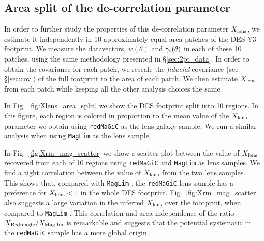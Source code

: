\documentclass[aps, prd,twocolumn,superscriptaddress,nofootinbib,preprintnumbers]{revtex4-1}
\newcommand{\gammat}{\ensuremath{\gamma_{\rm t}(\theta)}}
\newcommand{\redmagic}{\texttt{redMaGiC} }
\newcommand{\maglim}{\texttt{MagLim} }
\newcommand{\SP}[1]{{\color{orange}[SP: #1]}}
\begin{document}
\subsection{Area split of the de-correlation parameter}
In order to further study the properties of this de-correlation parameter $X_{\rm lens}$, we estimate it independently in 10 approximately equal area patches  of the DES Y3 footprint.  We measure the datavectors, $w(\theta)$ and $\gammat$ in each of these 10 patches, using the same methodology presented in \S\ref{sec:2pt_data}. In order to obtain the covariance for each patch, we rescale the \textit{fiducial} covariance (see \S\ref{sec:cov}) of the full footprint to the area of each patch. We then estimate  $X_{\rm lens}$ from each patch while keeping all the other analysis choices the same. 

In Fig.~\ref{fig:Xlens_area_split} we show the DES footprint split into 10 regions. In this figure, each region is colored in proportion to the mean value of the $X_{\rm lens}$ parameter we obtain using \redmagic as the lens galaxy sample. We run a similar analysis when using \maglim as the lens sample. 


In Fig.~\ref{fig:Xrm_mag_scatter} we show a scatter plot between the value of $X_{\rm lens}$ recovered from each of 10 regions using \redmagic and \maglim as lens samples. We find a tight correlation between the value of $X_{\rm lens}$ from the two lens samples. This shows that, compared with \maglim, the \redmagic lens sample has a preference for $X_{\rm lens} < 1$ in the whole DES footprint. Fig.~\ref{fig:Xrm_mag_scatter} also suggests a large variation  in the inferred $X_{\rm lens}$ over the footprint, when compared to \maglim. This correlation and area independence of the ratio $X_{\rm Redmagic}/X_{\rm Maglim}$ is remarkable and suggests that the potential systematic in the \redmagic sample has a more global origin. 

\end{document}
